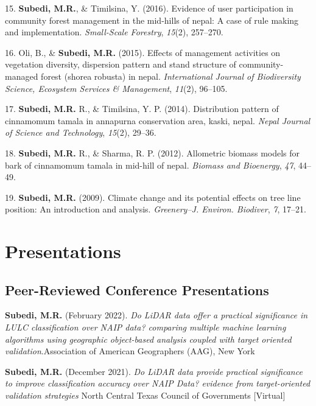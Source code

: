 \documentclass[11pt,a4paper,]{awesome-cv}
\newlength{\cslhangindent}
\newenvironment{CSLReferences}[2] %
 {\begin{list}{}{%
  \setlength{\itemindent}{0pt}
  \setlength{\leftmargin}{0pt}
  \setlength{\parsep}{0pt}
  \ifodd #1
   \setlength{\leftmargin}{\cslhangindent}
   \setlength{\itemindent}{-1\cslhangindent}
  \fi
  \setlength{\itemsep}{#2\baselineskip}}}
 {\end{list}}
\begin{document}
\begin{CSLReferences}{1}{0}
15. \textbf{Subedi, M.R.}, \& Timilsina, Y. (2016). Evidence of user
participation in community forest management in the mid-hills of nepal:
A case of rule making and implementation. \emph{Small-Scale Forestry},
\emph{15}(2), 257--270.

16. Oli, B., \& \textbf{Subedi, M.R.} (2015). Effects of management
activities on vegetation diversity, dispersion pattern and stand
structure of community-managed forest (shorea robusta) in nepal.
\emph{International Journal of Biodiversity Science, Ecosystem Services
\& Management}, \emph{11}(2), 96--105.

17. \textbf{Subedi, M.R.} R., \& Timilsina, Y. P. (2014). Distribution
pattern of cinnamomum tamala in annapurna conservation area, kaski,
nepal. \emph{Nepal Journal of Science and Technology}, \emph{15}(2),
29--36.

18. \textbf{Subedi, M.R.} R., \& Sharma, R. P. (2012). Allometric
biomass models for bark of cinnamomum tamala in mid-hill of nepal.
\emph{Biomass and Bioenergy}, \emph{47}, 44--49.

19. \textbf{Subedi, M.R.} (2009). Climate change and its potential
effects on tree line position: An introduction and analysis.
\emph{Greenery--J. Environ. Biodiver}, \emph{7}, 17--21.

\end{CSLReferences}

\section{Presentations}\label{presentations}

\subsection{Peer-Reviewed Conference
Presentations}\label{peer-reviewed-conference-presentations}

\textbf{Subedi, M.R.} (February 2022). \emph{Do LiDAR data offer a
practical significance in LULC classification over NAIP data? comparing
multiple machine learning algorithms using geographic object-based
analysis coupled with target oriented validation}.Association of
American Geographers (AAG), New York

\textbf{Subedi, M.R.} (December 2021). \emph{Do LiDAR data provide
practical significance to improve classification accuracy over NAIP
Data? evidence from target-oriented validation strategies} North Central
Texas Council of Governments {[}Virtual{]}
\end{document}

